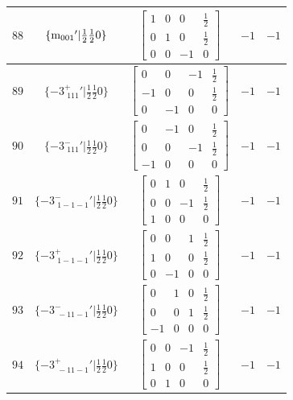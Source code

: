 \documentclass[fleqn,8pt]{jsarticle}
\begin{document}
\begin{longtable}{ccccc}
$ 88 $ & $ \{{\rm m}_{001}{}'|\frac{1}{2} \frac{1}{2} 0\} $ & $ \begin{bmatrix} 1 & 0 & 0 & \frac{1}{2} \\ 0 & 1 & 0 & \frac{1}{2} \\ 0 & 0 & -1 & 0 \end{bmatrix} $ & $ -1 $ & $ -1 $ \\ \hline
$ 89 $ & $ \{-3^{+}_{\,\,111}{}'|\frac{1}{2} \frac{1}{2} 0\} $ & $ \begin{bmatrix} 0 & 0 & -1 & \frac{1}{2} \\ -1 & 0 & 0 & \frac{1}{2} \\ 0 & -1 & 0 & 0 \end{bmatrix} $ & $ -1 $ & $ -1 $ \\ \hline
$ 90 $ & $ \{-3^{-}_{\,\,111}{}'|\frac{1}{2} \frac{1}{2} 0\} $ & $ \begin{bmatrix} 0 & -1 & 0 & \frac{1}{2} \\ 0 & 0 & -1 & \frac{1}{2} \\ -1 & 0 & 0 & 0 \end{bmatrix} $ & $ -1 $ & $ -1 $ \\ \hline
$ 91 $ & $ \{-3^{-}_{\,\,1-1-1}{}'|\frac{1}{2} \frac{1}{2} 0\} $ & $ \begin{bmatrix} 0 & 1 & 0 & \frac{1}{2} \\ 0 & 0 & -1 & \frac{1}{2} \\ 1 & 0 & 0 & 0 \end{bmatrix} $ & $ -1 $ & $ -1 $ \\ \hline
$ 92 $ & $ \{-3^{+}_{\,\,1-1-1}{}'|\frac{1}{2} \frac{1}{2} 0\} $ & $ \begin{bmatrix} 0 & 0 & 1 & \frac{1}{2} \\ 1 & 0 & 0 & \frac{1}{2} \\ 0 & -1 & 0 & 0 \end{bmatrix} $ & $ -1 $ & $ -1 $ \\ \hline
$ 93 $ & $ \{-3^{-}_{\,\,-11-1}{}'|\frac{1}{2} \frac{1}{2} 0\} $ & $ \begin{bmatrix} 0 & 1 & 0 & \frac{1}{2} \\ 0 & 0 & 1 & \frac{1}{2} \\ -1 & 0 & 0 & 0 \end{bmatrix} $ & $ -1 $ & $ -1 $ \\ \hline
$ 94 $ & $ \{-3^{+}_{\,\,-11-1}{}'|\frac{1}{2} \frac{1}{2} 0\} $ & $ \begin{bmatrix} 0 & 0 & -1 & \frac{1}{2} \\ 1 & 0 & 0 & \frac{1}{2} \\ 0 & 1 & 0 & 0 \end{bmatrix} $ & $ -1 $ & $ -1 $ \\ \hline

\end{longtable}
\end{document}
